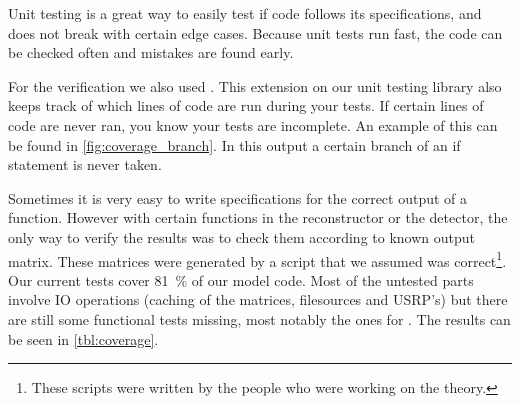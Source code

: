 \documentclass[a4paper, openany, oneside]{memoir}
\begin{document}
Unit testing is a great way to easily test if code follows its specifications, and does not break with certain edge cases. Because unit tests run fast, the code can be checked often and mistakes are found early.

For the verification we also used . This extension on our unit testing library also keeps track of which lines of code are run during your tests. If certain lines of code are never ran, you know your tests are incomplete. An example of this can be found in \cref{fig:coverage_branch}. In this output a certain branch of an if statement is never taken.

Sometimes it is very easy to write specifications for the correct output of a function. However with certain functions in the reconstructor or the detector, the only way to verify the results was to check them according to known output matrix. These matrices were generated by a \matlab{} script that we assumed was correct\footnote{These \matlab{} scripts were written by the people who were working on the theory.}. Our current tests cover \SI{81}{\percent} of our model code. Most of the untested parts involve IO operations (caching of the matrices, filesources and USRP's) but there are still some functional tests missing, most notably the ones for . The results can be seen in \cref{tbl:coverage}.
\end{document}
